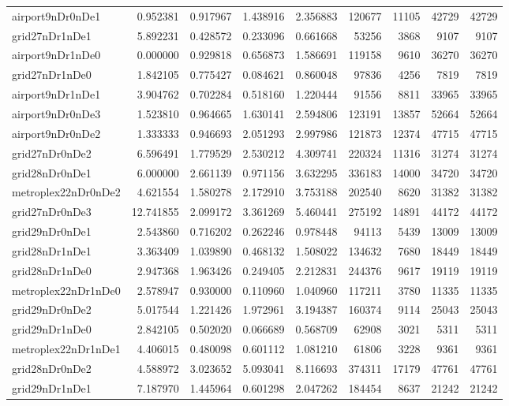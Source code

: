 \begin{longtable}{|l|r|r|r|r|r|r|r|r|}
airport9nDr0nDe1 & 0.952381 & 0.917967 & 1.438916 & 2.356883 & 120677 & 11105 & 42729 & 42729 \\
grid27nDr1nDe1 & 5.892231 & 0.428572 & 0.233096 & 0.661668 & 53256 & 3868 & 9107 & 9107 \\
airport9nDr1nDe0 & 0.000000 & 0.929818 & 0.656873 & 1.586691 & 119158 & 9610 & 36270 & 36270 \\
grid27nDr1nDe0 & 1.842105 & 0.775427 & 0.084621 & 0.860048 & 97836 & 4256 & 7819 & 7819 \\
airport9nDr1nDe1 & 3.904762 & 0.702284 & 0.518160 & 1.220444 & 91556 & 8811 & 33965 & 33965 \\
airport9nDr0nDe3 & 1.523810 & 0.964665 & 1.630141 & 2.594806 & 123191 & 13857 & 52664 & 52664 \\
airport9nDr0nDe2 & 1.333333 & 0.946693 & 2.051293 & 2.997986 & 121873 & 12374 & 47715 & 47715 \\
grid27nDr0nDe2 & 6.596491 & 1.779529 & 2.530212 & 4.309741 & 220324 & 11316 & 31274 & 31274 \\
grid28nDr0nDe1 & 6.000000 & 2.661139 & 0.971156 & 3.632295 & 336183 & 14000 & 34720 & 34720 \\
metroplex22nDr0nDe2 & 4.621554 & 1.580278 & 2.172910 & 3.753188 & 202540 & 8620 & 31382 & 31382 \\
grid27nDr0nDe3 & 12.741855 & 2.099172 & 3.361269 & 5.460441 & 275192 & 14891 & 44172 & 44172 \\
grid29nDr0nDe1 & 2.543860 & 0.716202 & 0.262246 & 0.978448 & 94113 & 5439 & 13009 & 13009 \\
grid28nDr1nDe1 & 3.363409 & 1.039890 & 0.468132 & 1.508022 & 134632 & 7680 & 18449 & 18449 \\
grid28nDr1nDe0 & 2.947368 & 1.963426 & 0.249405 & 2.212831 & 244376 & 9617 & 19119 & 19119 \\
metroplex22nDr1nDe0 & 2.578947 & 0.930000 & 0.110960 & 1.040960 & 117211 & 3780 & 11335 & 11335 \\
grid29nDr0nDe2 & 5.017544 & 1.221426 & 1.972961 & 3.194387 & 160374 & 9114 & 25043 & 25043 \\
grid29nDr1nDe0 & 2.842105 & 0.502020 & 0.066689 & 0.568709 & 62908 & 3021 & 5311 & 5311 \\
metroplex22nDr1nDe1 & 4.406015 & 0.480098 & 0.601112 & 1.081210 & 61806 & 3228 & 9361 & 9361 \\
grid28nDr0nDe2 & 4.588972 & 3.023652 & 5.093041 & 8.116693 & 374311 & 17179 & 47761 & 47761 \\
grid29nDr1nDe1 & 7.187970 & 1.445964 & 0.601298 & 2.047262 & 184454 & 8637 & 21242 & 21242 \\

\end{longtable}
